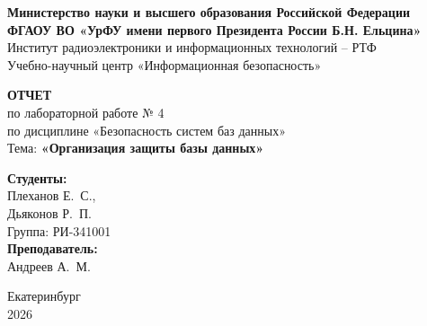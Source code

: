 \begin{titlepage}
    \centering
    \textbf{Министерство науки и высшего образования Российской Федерации\\
    ФГАОУ ВО «УрФУ имени первого Президента России Б.Н. Ельцина»}\\
    {Институт радиоэлектроники и информационных технологий – РТФ\\
    Учебно-научный центр «Информационная безопасность»}

    \vspace{4cm}

    {\LARGE\textbf{ОТЧЕТ}}\\
    {\Large по лабораторной работе № 4}\\
    {\large по дисциплине «Безопасность систем баз данных»\\
    Тема: \textbf{«Организация защиты базы данных»}}

    \vspace{4cm}

    \begin{flushright}
        \begin{minipage}{0.3\textwidth}
            \textbf{Студенты:}\\
            Плеханов Е.\ С.,\\
            Дьяконов Р.\ П.\\
            Группа: РИ-341001\\
            \textbf{Преподаватель:}\\
            Андреев А.\ М.
        \end{minipage}
    \end{flushright}

    \vfill

    \large{Екатеринбург\\2026}
\end{titlepage}